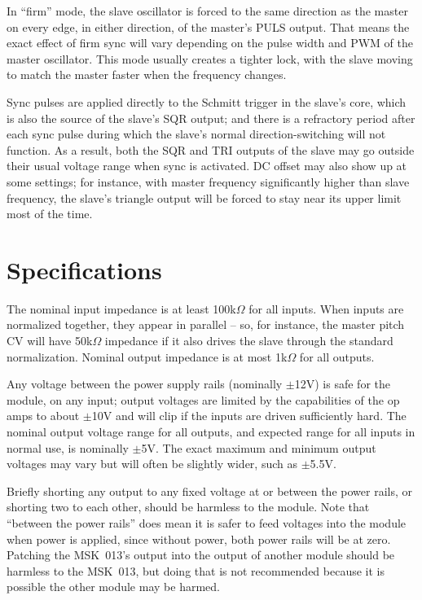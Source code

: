 In ``firm'' mode, the slave oscillator is forced to the same direction as
the master on every edge, in either direction, of the master's PULS output. 
That means the exact effect of firm sync will vary depending on the pulse
width and PWM of the master oscillator.  This mode usually creates a tighter
lock, with the slave moving to match the master faster when the frequency
changes.

Sync pulses are applied directly to the Schmitt trigger in the slave's core,
which is also the source of the slave's SQR output; and there is a
refractory period after each sync pulse during which the slave's normal
direction-switching will not function.  As a result, both the SQR and TRI
outputs of the slave may go outside their usual voltage range when sync is
activated.  DC offset may also show up at some settings; for instance, with
master frequency significantly higher than slave frequency, the slave's
triangle output will be forced to stay near its upper limit most of the
time.

\section{Specifications}

The nominal input impedance is at least 100k$\Omega$ for all inputs.  When
inputs are normalized together, they appear in parallel -- so, for instance,
the master pitch CV will have 50k$\Omega$ impedance if it also drives the
slave through the standard normalization.  Nominal output impedance is
at most 1k$\Omega$ for all outputs.

Any voltage between the power supply rails (nominally $\pm$12V) is safe for
the module, on any input; output voltages are limited by the capabilities of
the op amps to about $\pm$10V and will clip if the inputs are driven
sufficiently hard.  The nominal output voltage range for all outputs, and
expected range for all inputs in normal use, is nominally $\pm$5V.  The
exact maximum and minimum output voltages may vary but will often be
slightly wider, such as $\pm$5.5V.

Briefly shorting any output to any fixed voltage at or between the power
rails, or shorting two to each other, should be harmless to the module. 
Note that ``between the power rails'' does mean it is safer to feed voltages
into the module when power is applied, since without power, both power rails
will be at zero.  Patching the MSK~013's output into the output of another
module should be harmless to the MSK~013, but doing that is not recommended
because it is possible the other module may be harmed.

